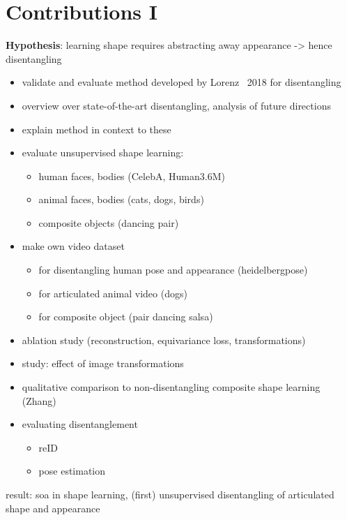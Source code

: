 \section{Contributions I}
	\textbf{Hypothesis}: learning shape requires abstracting away appearance -> hence disentangling
	\begin{itemize}
		\item validate and evaluate method developed by Lorenz \etal\ 2018 for disentangling
		\item overview over state-of-the-art disentangling, analysis of future directions
		\item explain method in context to these
		\item evaluate unsupervised shape learning:
			\begin{itemize}
				\item human faces, bodies (CelebA, Human3.6M)
				\item animal faces, bodies (cats, dogs, birds)
				\item composite objects (dancing pair)
			\end{itemize}
		\item make own video dataset
			\begin{itemize}
				\item for disentangling human pose and appearance (heidelbergpose)
				\item for articulated animal video (dogs)
				\item for composite object (pair dancing salsa)
			\end{itemize}
		\item ablation study (reconstruction, equivariance loss, transformations)
		\item study: effect of image transformations
		\item qualitative comparison to non-disentangling composite shape learning (Zhang)
		\item evaluating disentanglement
			\begin{itemize}
				\item reID
				\item pose estimation
			\end{itemize}
	\end{itemize}
	result: soa in shape learning, (first) unsupervised disentangling of articulated shape and appearance
\newpage
